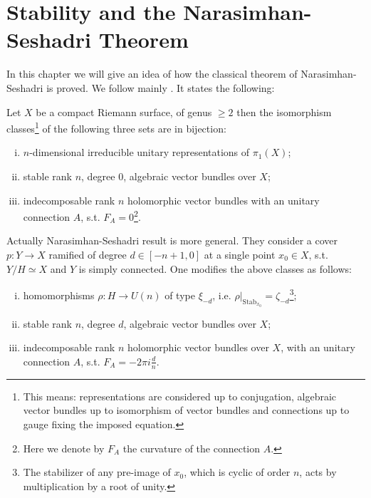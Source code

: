\newcommand{\sA}{\mathcal{A}}
\newcommand{\sB}{\mathcal{B}}
\newcommand{\sE}{\mathcal{E}}
\newcommand{\sF}{\mathcal{F}}
\newcommand{\sG}{\mathcal{G}}
\newcommand{\sL}{\mathcal{L}}
\newcommand{\sO}{\mathcal{O}}
\newcommand{\sP}{\mathcal{P}}

\newcommand{\bZ}{\mathbb{Z}}
\newtheorem{lem}{Lemma}

\chapter{Stability and the Narasimhan-Seshadri Theorem}

In this chapter we will give an idea of how the classical theorem of
Narasimhan-Seshadri is proved. We follow mainly \cite{NS}. It states
the following:
\begin{thm}
Let $X$ be a compact Riemann surface, of genus $\geq 2$ then the
isomorphism classes\footnote{This means: representations are considered up to
  conjugation, algebraic vector bundles up to isomorphism of vector
  bundles and connections up to gauge fixing the imposed equation.} of
the following three sets are in bijection:
\begin{enumerate}[(i)]
\item $n$-dimensional irreducible unitary representations of
  $\pi_1(X)$;
\item stable rank $n$, degree $0$, algebraic vector bundles over $X$;
\item indecomposable rank $n$ holomorphic vector bundles with an
  unitary connection $A$, s.t. $F_A=0$\footnote{Here we denote by
    $F_A$ the curvature of the connection $A$.}.
\end{enumerate}
\end{thm}

\begin{rem*}
Actually Narasimhan-Seshadri result is more general. They consider a cover $p: Y
\rightarrow X$ ramified of degree $d \in [-n+1,0]$ at a single point $x_0 \in
X$, s.t. $Y/H \simeq X$ and $Y$ is simply connected. One modifies the
above classes as follows:
\begin{enumerate}[(i)']
\item homomorphisms $\rho: H \rightarrow U(n)$ of type $\xi_{-d}$,
  i.e. $\left.\rho\right|_{\mbox{Stab}_{x_0}}=\zeta_{-d}$\footnote{The
  stabilizer of any pre-image of $x_0$, which is cyclic of order $n$,
  acts by multiplication by a root of unity.};
\item stable rank $n$, degree $d$, algebraic vector bundles over $X$;
\item indecomposable rank $n$ holomorphic vector bundles over $X$, with an
  unitary connection $A$, s.t. $F_A=-2\pi i\frac{d}{n}$.
\end{enumerate}
\end{rem*}

